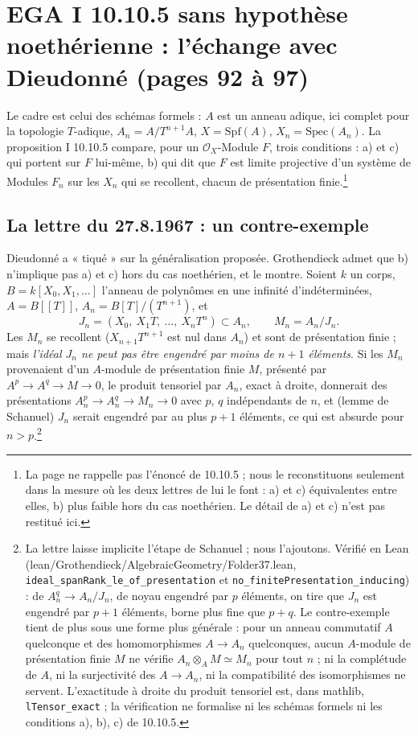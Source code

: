 \documentclass[11pt,a4paper]{article}
\begin{document}
\section*{EGA I 10.10.5 sans hypothèse noethérienne : l'échange avec Dieudonné (pages 92 à 97)}

Le cadre est celui des schémas formels : $A$ est un anneau adique, ici
complet pour la topologie $T$-adique, $A_n = A/T^{n+1}A$,
$X = \mathrm{Spf}(A)$, $X_n = \mathrm{Spec}(A_n)$. La proposition I 10.10.5
compare, pour un $\mathcal{O}_X$-Module $F$, trois conditions : a) et c) qui
portent sur $F$ lui-même, b) qui dit que $F$ est limite projective d'un
système de Modules $F_n$ sur les $X_n$ qui se recollent, chacun de
présentation finie.\footnote{La page ne rappelle pas l'énoncé de 10.10.5 ;
nous le reconstituons seulement dans la mesure où les deux lettres de lui le
font : a) et c) équivalentes entre elles, b) plus faible hors du cas
noethérien. Le détail de a) et c) n'est pas restitué ici.}

\subsection*{La lettre du 27.8.1967 : un contre-exemple}

Dieudonné a « tiqué » sur la généralisation proposée. Grothendieck admet que
b) n'implique pas a) et c) hors du cas noethérien, et le montre. Soient $k$
un corps, $B = k[X_0, X_1, \ldots]$ l'anneau de polynômes en une infinité
d'indéterminées, $A = B[[T]]$, $A_n = B[T]/(T^{n+1})$, et
\[
J_n = (X_0,\ X_1 T,\ \ldots,\ X_n T^n) \subset A_n , \qquad M_n = A_n/J_n .
\]
Les $M_n$ se recollent ($X_{n+1}T^{n+1}$ est nul dans $A_n$) et sont de
présentation finie ; mais \emph{l'idéal $J_n$ ne peut pas être engendré par
moins de $n+1$ éléments}. Si les $M_n$ provenaient d'un $A$-module de
présentation finie $M$, présenté par $A^p \to A^q \to M \to 0$, le produit
tensoriel par $A_n$, exact à droite, donnerait des présentations
$A_n^p \to A_n^q \to M_n \to 0$ avec $p$, $q$ indépendants de $n$, et
(lemme de Schanuel) $J_n$ serait engendré par au plus $p + 1$ éléments, ce
qui est absurde pour $n > p$.\footnote{La lettre laisse implicite l'étape de
Schanuel ; nous l'ajoutons. Vérifié en Lean (lean/Grothendieck/AlgebraicGeometry/Folder37.lean,
\texttt{ideal\_spanRank\_le\_of\_presentation} et
\texttt{no\_finitePresentation\_inducing}) : de $A_n^q \to A_n/J_n$, de noyau
engendré par $p$ éléments, on tire que $J_n$ est engendré par $p + 1$
éléments, borne plus fine que $p + q$. Le contre-exemple tient de plus sous une forme plus
générale : pour un anneau commutatif $A$ quelconque et des homomorphismes
$A \to A_n$ quelconques, aucun $A$-module de présentation finie $M$ ne vérifie
$A_n \otimes_A M \simeq M_n$ pour tout $n$ ; ni la complétude de $A$, ni la
surjectivité des $A \to A_n$, ni la compatibilité des isomorphismes ne
servent. L'exactitude à droite du produit tensoriel est, dans mathlib,
\texttt{lTensor\_exact} ; la vérification ne formalise ni les schémas formels
ni les conditions a), b), c) de 10.10.5.}
\end{document}
